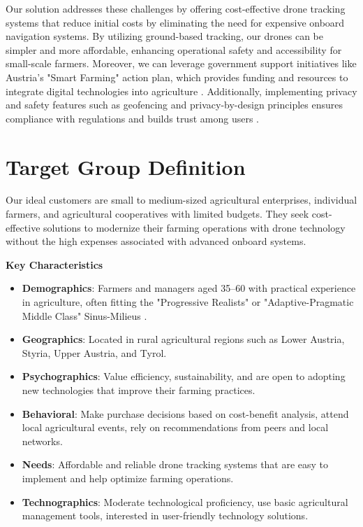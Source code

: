 Our solution addresses these challenges by offering cost-effective drone tracking systems that reduce initial costs by eliminating the need for expensive onboard navigation systems. By utilizing ground-based tracking, our drones can be simpler and more affordable, enhancing operational safety and accessibility for small-scale farmers. Moreover, we can leverage government support initiatives like Austria's "Smart Farming" action plan, which provides funding and resources to integrate digital technologies into agriculture \citep{smartfarming2023}. Additionally, implementing privacy and safety features such as geofencing and privacy-by-design principles ensures compliance with regulations and builds trust among users \citep{secure_redact_drones_privacy}.

\section{Target Group Definition}

Our ideal customers are small to medium-sized agricultural enterprises, individual farmers, and agricultural cooperatives with limited budgets. They seek cost-effective solutions to modernize their farming operations with drone technology without the high expenses associated with advanced onboard systems.

\textbf{Key Characteristics}

\begin{itemize}
	\item \textbf{Demographics}: Farmers and managers aged 35--60 with practical experience in agriculture, often fitting the "Progressive Realists" or "Adaptive-Pragmatic Middle Class" Sinus-Milieus  \cite{sinus_institut_2024}. 
	\item \textbf{Geographics}: Located in rural agricultural regions such as Lower Austria, Styria, Upper Austria, and Tyrol. 
	\item \textbf{Psychographics}: Value efficiency, sustainability, and are open to adopting new technologies that improve their farming practices. 
	\item \textbf{Behavioral}: Make purchase decisions based on cost-benefit analysis, attend local agricultural events, rely on recommendations from peers and local networks. 
	\item \textbf{Needs}: Affordable and reliable drone tracking systems that are easy to implement and help optimize farming operations. 
	\item \textbf{Technographics}: Moderate technological proficiency, use basic agricultural management tools, interested in user-friendly technology solutions. 
\end{itemize}

